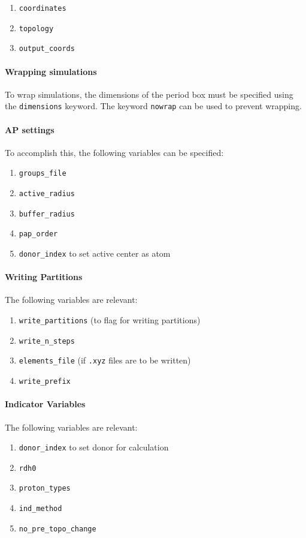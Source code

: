 \documentclass{article}
\begin{document}
\begin{enumerate}
	\item \texttt{coordinates}
	\item \texttt{topology}
	\item \texttt{output\_coords}
\end{enumerate}


\paragraph{Wrapping simulations}
To wrap simulations, the dimensions of the period box must be specified using the \texttt{dimensions} keyword. The keyword \texttt{nowrap} can be used to prevent wrapping.

\paragraph{AP settings}
To accomplish this, the following variables can be specified:
\begin{enumerate}
	\item \texttt{groups\_file}
	\item \texttt{active\_radius}
	\item \texttt{buffer\_radius}
	\item \texttt{pap\_order}
	\item \texttt{donor\_index} to set active center as atom	
\end{enumerate}

\paragraph{Writing Partitions}
The following variables are relevant:
\begin{enumerate}
	\item \texttt{write\_partitions} (to flag for writing partitions)
	\item \texttt{write\_n\_steps}
	\item \texttt{elements\_file} (if \texttt{.xyz} files are to be written)
	\item \texttt{write\_prefix}
\end{enumerate} 

\paragraph{Indicator Variables}
The following variables are relevant:
\begin{enumerate}
	\item \texttt{donor\_index} to set donor for calculation
	\item \texttt{rdh0}
	\item \texttt{proton\_types}
	\item \texttt{ind\_method}
	\item \texttt{no\_pre\_topo\_change}
\end{enumerate}
\end{document}

